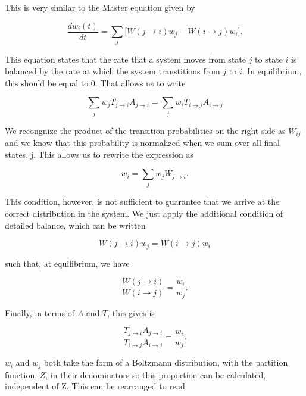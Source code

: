 \documentclass[%
oneside,                 %
final,                   %
10pt]{article}
\begin{document}
This is very similar to the Master equation given by

\begin{equation*}
\frac{dw_i(t)}{dt}=\sum_j \lbrack W(j \rightarrow i) w_j - W(i \rightarrow j) w_i \rbrack.
\end{equation*}

This equation states that the rate that a system moves from state $j$ to state $i$ is balanced by the rate at which the system transtitions from $j$ to $i$.  In equilibrium, this should be equal to 0.  That allows us to write

\begin{equation*}
\sum_j w_j T_{j \rightarrow i}A_{j \rightarrow i} = \sum_j w_i T_{i \rightarrow j}A_{i \rightarrow j}
\end{equation*}

We recongnize the product of the transition probabilities on the right side as $W_{ij}$ and we know that this probability is normalized when we sum over all final states, j.  This allows us to rewrite the expression as

\begin{equation*}
w_i=\sum_j w_j W_{j \rightarrow i}.
\end{equation*}

This condition, however, is not sufficient to guarantee that we arrive at the correct distribution in the system.  We just apply the additional condition of detailed balance, which can be written

\begin{equation*}
W(j \rightarrow i)w_j = W(i \rightarrow j) w_i
\end{equation*}

such that, at equilibrium, we have

\begin{equation*}
\frac{W(j \rightarrow i)}{W(i \rightarrow j)}=\frac{w_i}{w_j}.
\end{equation*}

Finally, in terms of $A$ and $T$, this gives is

\begin{equation*}
\frac{T_{j \rightarrow i}A_{j \rightarrow i}}{T_{i \rightarrow j}A_{i \rightarrow j}}=\frac{w_i}{w_j}.
\end{equation*}

$w_i$ and $w_j$ both take the form of a Boltzmann distribution, with the partition function, $Z$, in their denominators so this proportion can be calculated, independent of Z. This can be rearranged to read
\end{document}
